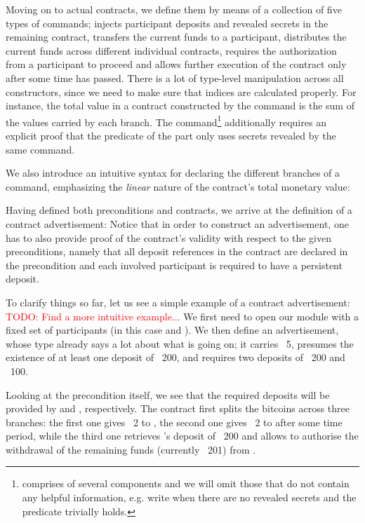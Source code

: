 \documentclass[acmsmall,nonacm=true,screen=true]{acmart}
\newcommand\todo[1]{\textcolor{red}{TODO: #1}}
\begin{document}
Moving on to actual contracts, we define them by means of a collection of five types of commands;
\inlinePut{} injects participant deposits and revealed secrets in the remaining contract,
\inlineWithdraw{} transfers the current funds to a participant,
\inlineSplit{} distributes the current funds across different individual contracts,
\inlineAuthDecoration{} requires the authorization from a participant to proceed
and \inlineTimeDecoration{} allows further execution of the contract only after some time has passed.
\BITcontracts{}
There is a lot of type-level manipulation across all constructors, since we need to make sure that indices are
calculated properly. For instance, the total value in a contract constructed by the \inlineSplit{} command is the 
sum of the values carried by each branch.
The \inlinePut{} command\footnote{
\inlinePut{} comprises of several components and we will omit those that do not contain any helpful information,
e.g. write \inlineSimplePut{} when there are no revealed secrets and the predicate trivially holds.
} additionally requires an explicit proof that the predicate
of the \inlineIf{} part only uses secrets revealed by the same command.

We also introduce an intuitive syntax for declaring the different branches of a \inlineSplit{} command, emphasizing the
\textit{linear} nature of the contract's total monetary value:
\BITlollipop{}

Having defined both preconditions and contracts, we arrive at the definition of a contract advertisement:
\BITadvertisements{}
Notice that in order to construct an advertisement, one has to also provide proof of the contract's validity with respect to
the given preconditions, namely that all deposit references in the contract are declared in the precondition
and each involved participant is required to have a persistent deposit.

To clarify things so far, let us see a simple example of a contract advertisement:
\\ \todo{Find a more intuitive example...}
\BITexampleAdvertisement{}
We first need to open our module with a fixed set of participants (in this case \inlineA{} and \inlineB{}).
We then define an advertisement, whose type already says a lot about what is going on;
it carries \bitcoin ~5, presumes the existence of at least one deposit of \bitcoin ~200, and requires two deposits
of \bitcoin ~200 and \bitcoin ~100.

Looking at the precondition itself, we see that the required deposits will be provided by \inlineB{} and \inlineA{}, respectively.
The contract first splits the bitcoins across three branches:
the first one gives \bitcoin ~2 to \inlineB{}, the second one gives \bitcoin ~2 to \inlineA{} after some time period,
while the third one retrieves \inlineB{}'s deposit of \bitcoin ~200 and allows \inlineB{} to authorise the
withdrawal of the remaining funds (currently \bitcoin ~201) from \inlineA{}.
\end{document}
